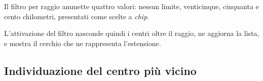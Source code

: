 Il filtro per raggio ammette quattro valori: nessun limite, venticinque, cinquanta e cento chilometri, presentati come
scelte a \textit{chip}. %

L'attivazione del filtro nasconde quindi i centri oltre il raggio, ne aggiorna la lista, e mostra il cerchio che ne
rappresenta l'estensione.



\subsection{Individuazione del centro più vicino}\label{subsec:impl-piu-vicino}

